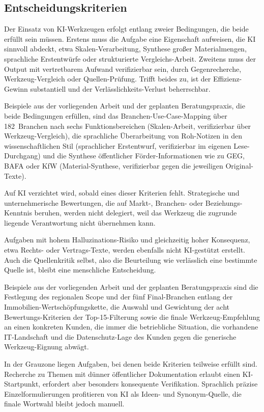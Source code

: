 \documentclass[a4paper,11pt]{article}
\begin{document}
\subsection{Entscheidungskriterien}

Der Einsatz von KI-Werkzeugen erfolgt entlang zweier Bedingungen, die
beide erfüllt sein müssen. Erstens muss die Aufgabe eine Eigenschaft
aufweisen, die KI sinnvoll abdeckt, etwa Skalen-Verarbeitung, Synthese
großer Materialmengen, sprachliche Erstentwürfe oder strukturierte
Vergleichs-Arbeit. Zweitens muss der Output mit vertretbarem Aufwand
verifizierbar sein, durch Gegenrecherche, Werkzeug-Vergleich oder
Quellen-Prüfung. Trifft beides zu, ist der Effizienz-Gewinn substantiell
und der Verlässlichkeits-Verlust beherrschbar.

Beispiele aus der vorliegenden Arbeit und der geplanten Beratungspraxis,
die beide Bedingungen erfüllen, sind das Branchen-Use-Case-Mapping
über 182~Branchen nach sechs Funktionsbereichen (Skalen-Arbeit,
verifizierbar über Werkzeug-Vergleich), die sprachliche Überarbeitung
von Roh-Notizen in den wissenschaftlichen Stil (sprachlicher
Erstentwurf, verifizierbar im eigenen Lese-Durchgang) und die
Synthese öffentlicher Förder-Informationen wie zu GEG, BAFA oder KfW
(Material-Synthese, verifizierbar gegen die jeweiligen Original-Texte).

Auf KI verzichtet wird, sobald eines dieser Kriterien fehlt. Strategische
und unternehmerische Bewertungen, die auf Markt-, Branchen- oder
Beziehungs-Kenntnis beruhen, werden nicht delegiert, weil das Werkzeug
die zugrunde liegende Verantwortung nicht übernehmen kann.

Aufgaben mit hohem Halluzinations-Risiko und gleichzeitig hoher
Konsequenz, etwa Rechts- oder Vertrags-Texte, werden ebenfalls nicht
KI-gestützt erstellt. Auch die Quellenkritik selbst, also die
Beurteilung wie verlässlich eine bestimmte Quelle ist, bleibt eine
menschliche Entscheidung.

Beispiele aus der vorliegenden Arbeit und der geplanten Beratungspraxis
sind die Festlegung des regionalen Scope und der fünf Final-Branchen
entlang der Immobilien-Wertschöpfungskette, die Auswahl und Gewichtung
der acht Bewertungs-Kriterien der Top-15-Filterung sowie die finale
Werkzeug-Empfehlung an einen konkreten Kunden, die immer die
betriebliche Situation, die vorhandene IT-Landschaft und die
Datenschutz-Lage des Kunden gegen die generische Werkzeug-Eignung
abwägt.

In der Grauzone liegen Aufgaben, bei denen beide Kriterien teilweise
erfüllt sind. Recherche zu Themen mit dünner öffentlicher Dokumentation
erlaubt einen KI-Startpunkt, erfordert aber besonders konsequente
Verifikation. Sprachlich präzise Einzelformulierungen profitieren von KI
als Ideen- und Synonym-Quelle, die finale Wortwahl bleibt jedoch
manuell.
\end{document}

